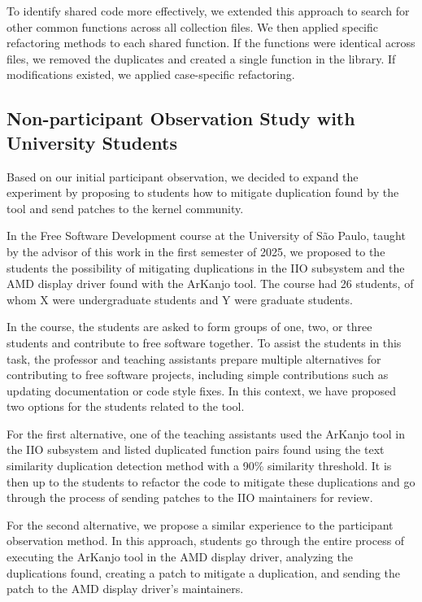 To identify shared code more effectively, we extended this approach to search for other common 
functions across all collection files. We then applied specific refactoring methods to each shared 
function. If the functions were identical across files, we removed the duplicates and created a single 
function in the library. If modifications existed, we applied case-specific refactoring.

\subsection{Non-participant Observation Study with University Students}

Based on our initial participant observation, we decided to expand the experiment by proposing 
to students how to mitigate duplication found by the tool and send patches to the kernel community.

In the Free Software Development course at the University of São Paulo, taught by the advisor of 
this work in the first semester of 2025, we proposed to the students the possibility of mitigating 
duplications in the IIO subsystem and the AMD display driver found with the ArKanjo tool. 
The course had 26 students, of whom X were undergraduate students and Y were graduate students.

In the course, the students are asked to form groups of one, two, or three students and contribute 
to free software together. To assist the students in this task, the professor and teaching assistants 
prepare multiple alternatives for contributing to free software projects, including simple contributions 
such as updating documentation or code style fixes. In this context, we have proposed two options 
for the students related to the tool.

For the first alternative, one of the teaching assistants used the ArKanjo tool in the IIO subsystem 
and listed duplicated function pairs found using the text similarity duplication detection method with 
a 90\% similarity threshold. It is then up to the students to refactor the code to mitigate these 
duplications and go through the process of sending patches to the IIO maintainers for review.

For the second alternative, we propose a similar experience to the participant observation method. 
In this approach, students go through the entire process of executing the ArKanjo tool in the 
AMD display driver, analyzing the duplications found, creating a patch to mitigate a duplication, 
and sending the patch to the AMD display driver’s maintainers.

